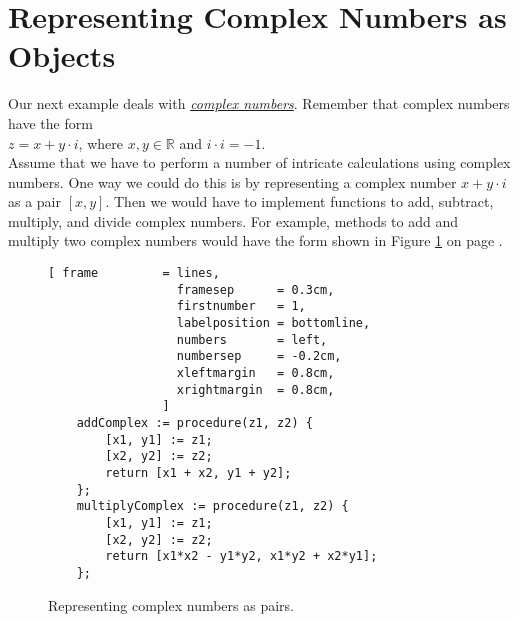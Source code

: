 \section{Representing Complex Numbers as Objects}
Our next example deals with 
\href{http://en.wikipedia.org/wiki/Complex_number}{\emph{complex numbers}}.  
Remember that complex numbers have the form
\\[0.2cm]
\hspace*{1.3cm}
$z = x + y \cdot i$, \quad where $x,y \in \mathbb{R}$ and $i \cdot i = -1$.
\\[0.2cm]
Assume that we have to perform a number of intricate calculations using complex numbers.  One way
we could do this is by representing a complex number $x + y \cdot i$ as a pair $[x,y]$.  Then we
would have to implement functions to add, subtract, multiply,  and divide complex numbers.  For
example, methods to add and multiply two complex numbers would have the form shown in Figure
\ref{fig:add-complex.stlx} on page \pageref{fig:add-complex.stlx}.
 

\begin{figure}[!ht]
\centering
\begin{Verbatim}[ frame         = lines, 
                  framesep      = 0.3cm, 
                  firstnumber   = 1,
                  labelposition = bottomline,
                  numbers       = left,
                  numbersep     = -0.2cm,
                  xleftmargin   = 0.8cm,
                  xrightmargin  = 0.8cm,
                ]
    addComplex := procedure(z1, z2) {
        [x1, y1] := z1;
        [x2, y2] := z2;
        return [x1 + x2, y1 + y2];	
    }; 
    multiplyComplex := procedure(z1, z2) {
        [x1, y1] := z1;
        [x2, y2] := z2;
        return [x1*x2 - y1*y2, x1*y2 + x2*y1];	
    }; 
\end{Verbatim}
\vspace*{-0.3cm}
\caption{Representing complex numbers as pairs.}
\label{fig:add-complex.stlx}
\end{figure}


